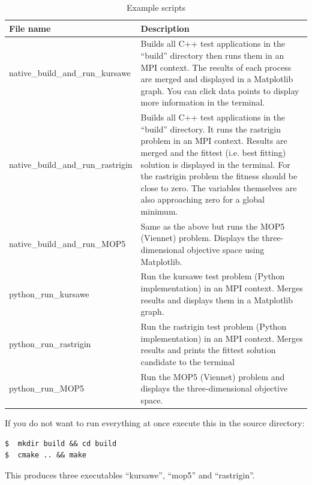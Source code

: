 \documentclass[12pt]{article}
\begin{document}
\begin{table}[ht]
\caption{Example scripts}
\begin{center}
\begin{tabular}{  l | p{10cm}  }
  \hline
   File name & Description \\
  \hline
  native\_build\_and\_run\_kursawe & Builds all C++ test applications in the ``build'' directory then runs them in an MPI context. The results of each process are merged and displayed in a Matplotlib graph. You can click data points to display more information in the terminal. \\
  native\_build\_and\_run\_rastrigin & Builds all C++ test applications in the ``build'' directory. It runs the rastrigin problem in an MPI context. Results are merged and the fittest (i.e. best fitting) solution is displayed in the terminal. For the rastrigin problem the fitness should be close to zero. The variables themselves are also approaching zero for a global minimum.  \\
native\_build\_and\_run\_MOP5 & Same as the above but runs the MOP5 (Viennet) problem. Displays the three-dimensional objective space using Matplotlib. \\
  python\_run\_kursawe & Run the kursawe test problem (Python implementation) in an MPI context. Merges results and displays them in a Matplotlib graph. \\
  python\_run\_rastrigin & Run the rastrigin test problem (Python implementation) in an MPI context. Merges results and prints the fittest solution candidate to the terminal \\
python\_run\_MOP5 & Run the MOP5 (Viennet) problem and displays the three-dimensional objective space. \\
  \hline
\end{tabular}
\end{center}
\end{table}
If you do not want to run everything at once execute this in the source directory:
\begin{lstlisting}[style=Bash]
$  mkdir build && cd build
$  cmake .. && make
\end{lstlisting}
This produces three executables ``kursawe'', ``mop5'' and ``rastrigin''. 
\end{document}
